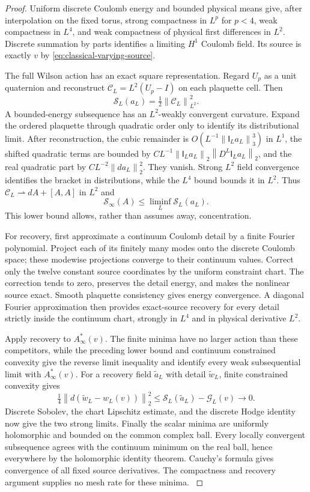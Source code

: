 \documentclass[11pt,oneside,openany]{book}
\theoremstyle{definition}
\theoremstyle{remark}
\newcommand{\norm}[1]{\left\lVert#1\right\rVert}
\newcommand{\src}[2]{\cite[#2]{#1}}
\begin{document}
\begin{proof}
Uniform discrete Coulomb energy and bounded physical means give,
after interpolation on the fixed torus, strong compactness in
$L^p$ for $p<4$, weak compactness in $L^4$, and weak compactness of
physical first differences in $L^2$. Discrete summation by parts
identifies a limiting $H^1$ Coulomb field. Its source is exactly
$v$ by \cref{eq:classical-varying-source}.

The full Wilson action has an exact square representation. Regard
$U_p$ as a unit quaternion and reconstruct
$\mathcal C_L=L^2(U_p-I)$ on each plaquette cell. Then
\[
 \mathcal S_L(a_L)=\tfrac12\norm{\mathcal C_L}_{L^2}^2.
\]
A bounded-energy subsequence has an $L^2$-weakly convergent
curvature. Expand the ordered plaquette through quadratic order
only to identify its distributional limit. After reconstruction,
the cubic remainder is $O(L^{-1}\norm{\mathsf I_La_L}_3^3)$ in
$L^1$, the shifted quadratic terms are bounded by
$CL^{-1}\norm{\mathsf I_La_L}_2\norm{D^L\mathsf I_La_L}_2$,
and the real quadratic part by $CL^{-2}\norm{da_L}_2^2$.
They vanish. Strong $L^2$ field convergence identifies the bracket
in distributions, while the $L^4$ bound bounds it in $L^2$.
Thus $\mathcal C_L\rightharpoonup dA+[A,A]$ in $L^2$ and
\[
 \mathcal S_\infty(A)\le\liminf_L\mathcal S_L(a_L).
\]
This lower bound allows, rather than assumes away, concentration.

For recovery, first approximate a continuum Coulomb detail by a
finite Fourier polynomial. Project each of its finitely many modes
onto the discrete Coulomb space; these modewise projections converge
to their continuum values. Correct only the twelve constant source
coordinates by the uniform constraint chart. The correction tends
to zero, preserves the detail energy, and makes the nonlinear source
exact. Smooth plaquette consistency gives energy convergence. A
diagonal Fourier approximation then provides exact-source recovery
for every detail strictly inside the continuum chart, strongly in
$L^4$ and in physical derivative $L^2$.

Apply recovery to $A_\infty^*(v)$. The finite minima have no larger
action than these competitors, while the preceding lower bound and
continuum constrained convexity give the reverse limit inequality
and identify every weak subsequential limit with $A_\infty^*(v)$.
For a recovery field $\widetilde a_L$ with detail $\widetilde w_L$,
finite constrained convexity gives
\begin{equation}
 \tfrac14\norm{d(\widetilde w_L-w_L(v))}_2^2
 \le\mathcal S_L(\widetilde a_L)-\mathcal G_L(v)\longrightarrow0.
 \label{eq:classical-minimum-defect}
\end{equation}
Discrete Sobolev, the chart Lipschitz estimate, and the discrete
Hodge identity now give the two strong limits. Finally the scalar
minima are uniformly holomorphic and bounded on the common complex
ball. Every locally convergent subsequence agrees with the
continuum minimum on the real ball, hence everywhere by the
holomorphic identity theorem. Cauchy's formula gives convergence of
all fixed source derivatives. The compactness and recovery argument
supplies no mesh rate for these minima. \src{SM}{V12--V13}
\end{proof}
\end{document}
